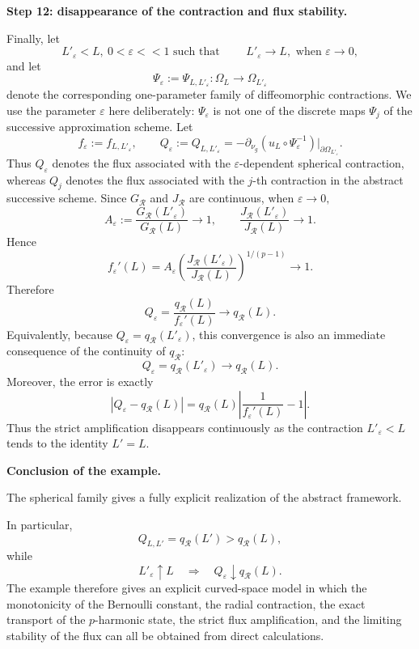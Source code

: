 \documentclass[11pt,a4paper]{article}
\theoremstyle{definition}
\theoremstyle{remark}
\begin{document}
\medskip
\noindent
\textbf{Step 12: disappearance of the contraction and flux stability.}

Finally, let
\[
L'_\varepsilon<L, \  0< \varepsilon << 1 \, \,  \mbox{such  that}\, \,
\qquad
L'_\varepsilon\longrightarrow L, \, \,  \mbox{when}\, \,  \varepsilon \rightarrow 0,
\]
and let
\[
\Psi_\varepsilon:=\Psi_{L,L'_\varepsilon}:\Omega_L
\longrightarrow\Omega_{L'_\varepsilon}
\]
denote the corresponding one-parameter family of diffeomorphic
contractions. We use the parameter $\varepsilon$ here deliberately:
$\Psi_\varepsilon$ is not one of the discrete maps $\Psi_j$ of the
successive approximation scheme. Let
\[
f_\varepsilon:=f_{L,L'_\varepsilon},
\qquad
Q_\varepsilon:=Q_{L,L'_\varepsilon}
=-\partial_{\nu_g}
\left(u_L\circ\Psi_\varepsilon^{-1}\right)
\big|_{\partial\Omega_{L'_\varepsilon}}.
\]
Thus $Q_\varepsilon$ denotes the flux associated with the
$\varepsilon$-dependent spherical contraction, whereas $Q_j$ denotes
the flux associated with the $j$-th contraction in the abstract
successive scheme.
Since $G_{\mathcal R}$ and $J_{\mathcal R}$ are continuous, when $\varepsilon \rightarrow 0,$
\[
A_\varepsilon
:=\frac{G_{\mathcal R}(L'_\varepsilon)}
{G_{\mathcal R}(L)}
\longrightarrow1,
\qquad
\frac{J_{\mathcal R}(L'_\varepsilon)}
{J_{\mathcal R}(L)}\longrightarrow1.
\]
Hence
\[
f_\varepsilon'(L)
=A_\varepsilon
\left(
\frac{J_{\mathcal R}(L'_\varepsilon)}
{J_{\mathcal R}(L)}
\right)^{1/(p-1)}
\longrightarrow1.
\]
Therefore
\[
Q_\varepsilon
=\frac{q_{\mathcal R}(L)}{f_\varepsilon'(L)}
\longrightarrow q_{\mathcal R}(L).
\]
Equivalently, because $Q_\varepsilon=q_{\mathcal R}(L'_\varepsilon)$,
this convergence is also an immediate consequence of the continuity of
$q_{\mathcal R}$:
\[
Q_\varepsilon=q_{\mathcal R}(L'_\varepsilon)
\longrightarrow q_{\mathcal R}(L).
\]
Moreover, the error is exactly
\[
|Q_\varepsilon-q_{\mathcal R}(L)|
=q_{\mathcal R}(L)
\left|\frac1{f_\varepsilon'(L)}-1\right|.
\label{eq:spherical-flux-error}
\]
Thus the strict amplification disappears continuously as the contraction
$L'_\varepsilon<L$ tends to the identity $L'=L$.

\medskip
\noindent
\textbf{Conclusion of the example.}

The spherical family gives a fully explicit realization of the abstract framework.

In particular,
\[
Q_{L,L'}=q_{\mathcal R}(L')
>q_{\mathcal R}(L),
\]
while
\[
L'_\varepsilon\uparrow L
\quad\Longrightarrow\quad
Q_\varepsilon\downarrow q_{\mathcal R}(L).
\]
The example therefore gives an explicit curved-space model in which the
monotonicity of the Bernoulli constant, the radial contraction, the exact
transport of the $p$-harmonic state, the strict flux amplification, and the
limiting stability of the flux can all be obtained from direct calculations.
\end{document}
